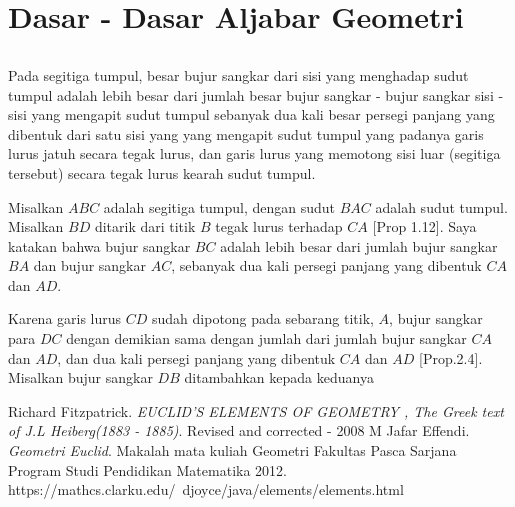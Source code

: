 \documentclass[a4paper, 12pt]{book}
\begin{document}
\setcounter{chapter}{2}
\chapter*{\centering \chaptername{ \thechapter} \\Dasar - Dasar Aljabar Geometri}
\setcounter{section}{12}
\section*{\centering \thesection} 

Pada segitiga tumpul, besar bujur sangkar dari sisi yang menghadap sudut tumpul
 adalah lebih besar dari jumlah besar bujur sangkar - bujur sangkar sisi - sisi yang 
mengapit sudut tumpul sebanyak dua kali besar persegi panjang yang dibentuk
dari satu sisi yang yang mengapit sudut tumpul yang padanya garis lurus jatuh
secara tegak lurus, dan garis lurus yang memotong sisi luar (segitiga tersebut) secara tegak lurus 
kearah sudut tumpul.


Misalkan $ABC$ adalah segitiga tumpul, dengan sudut $BAC$ adalah sudut tumpul.
Misalkan $BD$ ditarik dari titik $B$ tegak lurus terhadap $CA$ [Prop 1.12]. Saya
katakan bahwa bujur sangkar $BC$ adalah lebih besar dari jumlah bujur sangkar $BA$
dan bujur sangkar $AC$, sebanyak dua kali persegi panjang yang dibentuk $CA$ dan $AD$.

Karena garis lurus $CD$ sudah dipotong pada sebarang titik, $A$, bujur sangkar para $DC$
dengan demikian sama dengan jumlah dari jumlah bujur sangkar $CA$ dan $AD$, dan dua kali
persegi panjang yang dibentuk $CA$ dan $AD$ [Prop.2.4]. Misalkan bujur  sangkar $DB$
ditambahkan kepada keduanya 
\begin{thebibliography}{9}
Richard Fitzpatrick.
\textit{EUCLID’S ELEMENTS OF GEOMETRY , The Greek text of J.L Heiberg(1883 - 1885)}.
Revised and corrected - 2008 
M Jafar Effendi.
\textit{Geometri Euclid}.
Makalah mata kuliah Geometri Fakultas Pasca Sarjana Program Studi Pendidikan Matematika 2012.
https://mathcs.clarku.edu/~djoyce/java/elements/elements.html 
\end{thebibliography}
\end{document}
